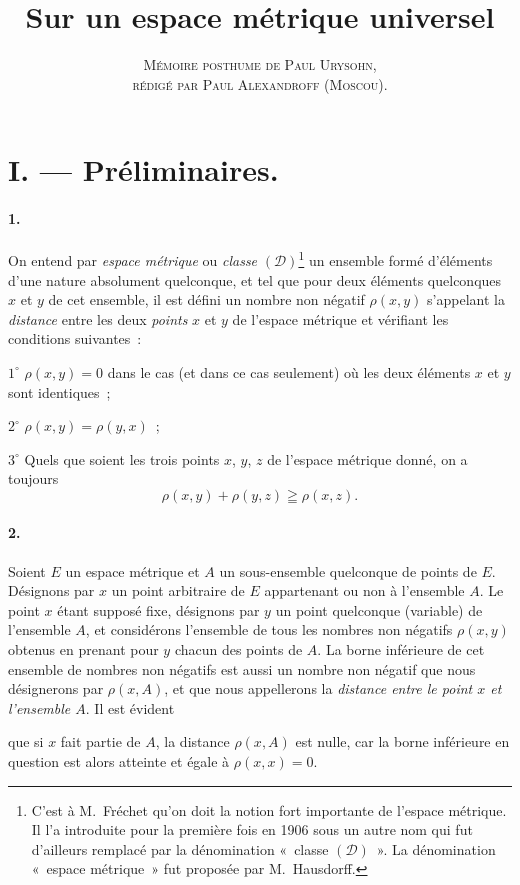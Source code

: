 \documentclass[a4paper,12pt]{amsart}
\newcommand{\srcpage}[1]{} %
\begin{document}
\title{Sur un espace métrique universel}
\author{\textsc{Mémoire posthume de Paul Urysohn,}\\
\textsc{rédigé par Paul Alexandroff (Moscou).}}
\maketitle
\srcpage{43}
\section*{I. --- Préliminaires.}
\paragraph{1.}
On entend par \textit{espace métrique} ou \textit{classe} $(\mathscr{D})$\footnote{C'est à M.~Fréchet qu'on doit la notion fort importante de l'espace métrique. Il l'a introduite pour la première fois en 1906 sous un autre nom qui fut d'ailleurs remplacé par la dénomination «~classe $(\mathscr{D})$~». La dénomination «~espace métrique~» fut proposée par M.~Hausdorff.}
un ensemble formé d'éléments d'une nature absolument quelconque, et tel que pour deux éléments quelconques $x$ et $y$ de cet ensemble, il est défini un nombre non négatif $\rho(x,y)$ s'appelant la \textit{distance} entre les deux \textit{points} $x$ et $y$ de l'espace métrique et vérifiant les conditions suivantes~:

$1^\circ$ $\rho(x,y)=0$ dans le cas (et dans ce cas seulement) où les deux éléments $x$ et $y$ sont identiques~;

$2^\circ$ $\rho(x,y)=\rho(y,x)$~;

$3^\circ$ Quels que soient les trois points $x$, $y$, $z$ de l'espace métrique donné, on a toujours
\[
\rho(x,y)+\rho(y,z)\geqq\rho(x,z).
\]
\paragraph{2.}
Soient $E$ un espace métrique et $A$ un sous-ensemble quelconque de points de $E$. Désignons par $x$ un point arbitraire de $E$ appartenant ou non à l'ensemble $A$. Le point $x$ étant supposé fixe, désignons par $y$ un point quelconque (variable) de l'ensemble $A$, et considérons l'ensemble de tous les nombres non négatifs $\rho(x,y)$ obtenus en prenant pour $y$ chacun des points de $A$. La borne inférieure de cet ensemble de nombres non négatifs est aussi un nombre non négatif que nous désignerons par $\rho(x,A)$, et que nous appellerons la \textit{distance entre le point $x$ et l'ensemble $A$}. Il est évident
\srcpage{44}
que si $x$ fait partie de $A$, la distance $\rho(x,A)$ est nulle, car la borne inférieure en question est alors atteinte et égale à $\rho(x,x)=0$.
\end{document}
